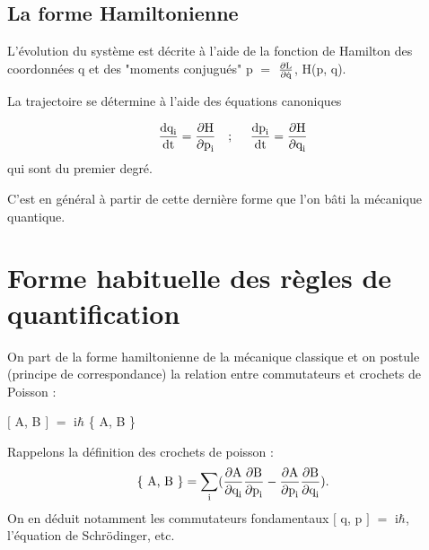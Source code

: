 \begin{center}  \end{center}

\subsection{La forme Hamiltonienne}
L'évolution du système est décrite à l'aide
de la fonction de Hamilton des coordonnées q et des "moments conjugués"
p $=$ $\frac{\partial \text{L}}{\partial \dot{\text{q}}}$, H(p, q).

La trajectoire se détermine à l'aide des équations canoniques

\[
\frac{\mt{dq}_\mt{i}}{\mt{dt}} = \frac{\partial \mt{H}}{\partial \mt{p}_\mt{i}}
\ \ \ ;\ \ \ \ 
\frac{\mt{dp}_\mt{i}}{\mt{dt}} = \frac{\partial \mt{H}}{\partial \mt{q}_\mt{i}}
\]
qui sont du premier degré.

C'est en général à partir de cette dernière forme que l'on bâti
la mécanique quantique.
\section{Forme habituelle des règles de quantification}

On part de la forme hamiltonienne de la mécanique classique
et on postule (principe de correspondance) la relation entre commutateurs
et crochets de Poisson :

\begin{center}
$[$ A, B $]$ $=$ i$\hbar$ \{ A, B \}
\end{center}

Rappelons la définition des crochets de poisson :
\[
\{\text{ A, B }\} = \sum_{\text{i}}
(\frac{\partial \text{A}}{\partial \text{q}_{\text{i}}}\frac{\partial \text{B}}{\partial \text{p}_{\text{i}}}
- \frac{\partial \text{A}}{\partial \text{p}_{\text{i}}}\frac{\partial \text{B}}{\partial \text{q}_{\text{i}}}).
\]
On en déduit notamment les commutateurs fondamentaux $[$ q, p $]$ $=$ i$\hbar$,
l'équation de Schrödinger, etc.

